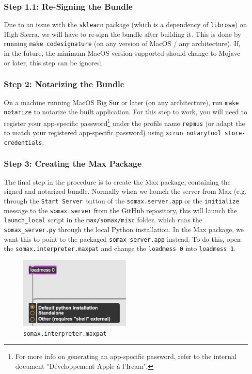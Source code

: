 \subsubsection{Step 1.1: Re-Signing the Bundle}
Due to an issue with the \texttt{sklearn} package (which is a dependency of \texttt{librosa}) on High Sierra, we will have to re-sign the bundle after building it. This is done by running \texttt{make codesignature} (on any version of MacOS / any architecture). If, in the future, the minimum MacOS version supported should change to Mojave or later, this step can be ignored.

\subsubsection{Step 2: Notarizing the Bundle}
On a machine running MacOS Big Sur or later (on any architecture), run \texttt{make notarize} to notarize the built application. For this step to work, you will need to register your app-specific password\footnote{For more info on generating an app-specific password, refer to the internal document "Développement Apple à l’Ircam".} under the profile name \texttt{repmus} (or adapt the  to match your registered app-specific password) using \texttt{xcrun notarytool store-credentials}.

\subsubsection{Step 3: Creating the Max Package}
The final step in the procedure is to create the Max package, containing the signed and notarized bundle. Normally when we launch the server from Max (e.g. through the \texttt{Start Server} button of the \texttt{somax.server.app} or the \texttt{initialize} message to the \texttt{somax.server} from the GitHub repository, this will launch the \texttt{launch\_local} script in the \texttt{max/somax/misc} folder, which runs the \texttt{somax\_server.py} through the local Python installation. In the Max package, we want this to point to the packaged \texttt{somax\_server.app} instead. To do this, open the \texttt{somax.interpreter.maxpat} and change the \texttt{loadmess 0} into \texttt{loadmess 1}.

\begin{figure}[h!]
    \centering        
 	\includegraphics[width=0.5\textwidth, keepaspectratio]{figures/somax_interpreter.png}
    \caption{\texttt{somax.interpreter.maxpat}}
    \label{fig:myFig}
\end{figure}

